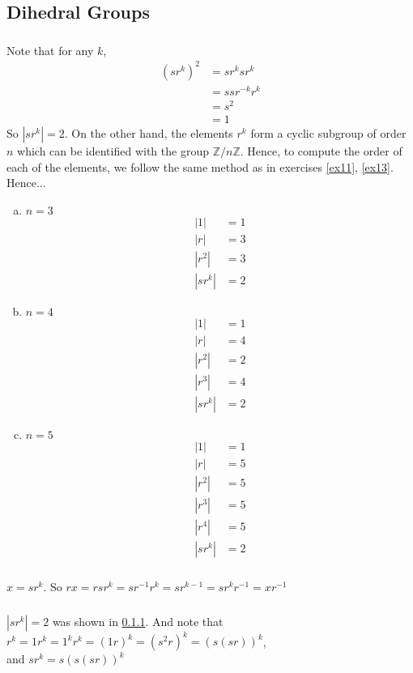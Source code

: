 \documentclass{article}
\newcommand{\ints}{\mathbb{Z}}
\newcommand{\inv}[1]{ {#1}^{-1} }
\begin{document}
\subsection{Dihedral Groups}
\subsubsection{}\label{ex2p1}
Note that for any $k$,
\begin{align*}
(sr^k)^2 &= sr^ksr^k\\
&= ssr^{-k}r^k\\
&= s^2\\
&= 1
\end{align*}
So $|sr^{k}| = 2$. On the other hand, the elements $r^k$ form a cyclic subgroup of order $n$ which can be identified with the group $\ints/n\ints$. Hence, to compute the order of each of the elements, we follow the same method as in exercises \ref{ex11}, \ref{ex13}. Hence...
\begin{enumerate}[(a)]
\item $n=3$
\begin{align*}
|1| &= 1\\
|r| &= 3\\
|r^2| &= 3\\
|sr^k| &= 2
\end{align*}
\item $n=4$
\begin{align*}
|1| &= 1\\
|r| &= 4\\
|r^2| &= 2\\
|r^3| &= 4\\
|sr^k| &= 2
\end{align*}
\item $n=5$
\begin{align*}
|1| &= 1\\
|r| &= 5\\
|r^2| &= 5\\
|r^3| &= 5\\
|r^4| &= 5\\
|sr^k| &= 2
\end{align*}
\end{enumerate}
\subsubsection{}\label{ex2p2}
$x = sr^k$. So $rx = rsr^k = s\inv{r}r^k = sr^{k-1} = sr^k\inv{r} = x\inv{r}$
\subsubsection{}\label{ex2p3}
$|sr^k| = 2$ was shown in \ref{ex2p1}. And note that\\
$r^k = 1r^k = 1^kr^k = (1r)^k = (s^2r)^k = (s(sr))^k$,\\
and $sr^k = s(s(sr))^k$
\end{document}
